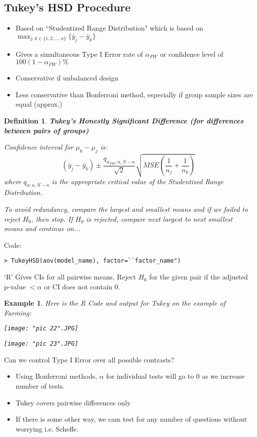 \documentclass[a4paper,11pt]{article}
\newtheorem{defn}[thm]{Definition}
\newtheorem{eg}[thm]{Example}
\begin{document}
\subsection{Tukey's HSD Procedure}
\begin{itemize}
\item Based on ``Studentized Range Distribution" which is based on $\max_{j,k\in\{1,2,...,a\}}\{\bar{y}_j-\bar{y}_k\}$
\item Gives a simultaneous Type I Error rate of $\alpha_{FW}$ or confidence level of $100(1-\alpha_{FW})\%$
\item Conservative if unbalanced design
\item Less conservative than Bonferroni method, especially if group sample sizes are equal (approx.)
\end{itemize}
\begin{defn}
\normalfont
\textbf{Tukey's Honestly Significant Difference (for differences between pairs of groups)}

Confidence interval for $\mu_k-\mu_j$ is:
$$(\bar{y}_j-\bar{y}_k)\pm \frac{q_{\alpha_{FW};a,N-a}}{\sqrt{2}}\sqrt{MSE(\frac{1}{n_j}+\frac{1}{n_k})}$$
where $q_{\alpha;a,N-a}$ is the appropriate critical value of the Studentized Range Distribution. 

To avoid redundancy, compare the largest and smallest means and if we failed to reject $H_0$, then stop. If $H_0$ is rejected, compare next largest to next smallest means and continue on...
\end{defn}
Code: 
\begin{lstlisting}
> TukeyHSD(aov(model_name), factor=``factor_name")
\end{lstlisting}
`R' Gives CIs for all pairwise means. Reject $H_0$ for the given pair if the adjusted p-value $<\alpha$ or CI does not contain 0.
\newpage
\begin{eg}
\normalfont
Here is the R Code and output for Tukey on the example of Farming: 

\begin{center}
	\texttt{[image: "pic 22".JPG]}
\end{center}

\begin{center}
	\texttt{[image: "pic 23".JPG]}
\end{center}
\end{eg}
\newpage
Can we control Type I Error over all possible contrasts?
\begin{itemize}
\item Using Bonferroni methods, $\alpha$ for individual tests will go to 0 as we increase number of tests.
\item Tukey covers pairwise differences only
\item If there is some other way, we cam test for any number of questions without worrying i.e. Scheffe.
\end{itemize}
\end{document}

